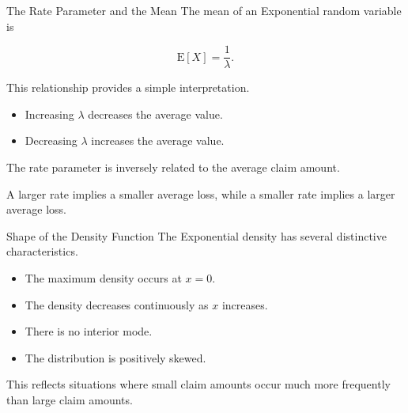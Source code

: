 \documentclass[
  ignorenonframetext,
  aspectratio=169,
]{beamer}
\providecommand{\tightlist}{%
  \setlength{\itemsep}{0pt}\setlength{\parskip}{0pt}}
\begin{document}
\begin{frame}{The Rate Parameter and the Mean}
\protect{}\label{the-rate-parameter-and-the-mean}
The mean of an Exponential random variable is

\[
\mathrm{E}[X]=\frac1{\lambda}.
\]

This relationship provides a simple interpretation.

\begin{itemize}
\tightlist
\item
  Increasing \(\lambda\) decreases the average value.
\item
  Decreasing \(\lambda\) increases the average value.
\end{itemize}

\begin{tcolorbox}[enhanced jigsaw, arc=.35mm, bottomrule=.15mm, bottomtitle=1mm, breakable, colback=white, colbacktitle=quarto-callout-tip-color!10!white, colframe=quarto-callout-tip-color-frame, coltitle=black, left=2mm, leftrule=.75mm, opacityback=0, opacitybacktitle=0.6, rightrule=.15mm, title=\textcolor{quarto-callout-tip-color}{\faLightbulb}\hspace{0.5em}{Interpretation}, titlerule=0mm, toprule=.15mm, toptitle=1mm]

The rate parameter is inversely related to the average claim amount.

A larger rate implies a smaller average loss, while a smaller rate
implies a larger average loss.

\end{tcolorbox}
\end{frame}

\begin{frame}{Shape of the Density Function}
\protect{}\label{shape-of-the-density-function}
The Exponential density has several distinctive characteristics.

\begin{itemize}
\tightlist
\item
  The maximum density occurs at \(x=0\).
\item
  The density decreases continuously as \(x\) increases.
\item
  There is no interior mode.
\item
  The distribution is positively skewed.
\end{itemize}

This reflects situations where small claim amounts occur much more
frequently than large claim amounts.
\end{frame}
\end{document}
